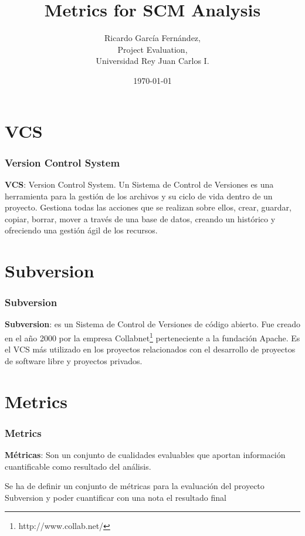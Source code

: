 \documentclass[xcolor=dvipsnames]{beamer}
\title{Metrics for SCM Analysis}
\author{Ricardo Garc\'ia Fern\'andez,\\
        Project Evaluation,\\
        Universidad Rey Juan Carlos I.}
\date{\today}
\begin{document}

\section[Index]{}
\begin{frame}[allowframebreaks]
\tableofcontents
\end{frame}

\section{VCS}
\begin{frame}[allowframebreaks]
\frametitle{Version Control System}

\textbf{VCS}: Version Control System. Un Sistema de Control de Versiones es una herramienta para la gesti\'on de los archivos y su ciclo de vida dentro de un proyecto. Gestiona todas las acciones que se realizan sobre ellos, crear, guardar, copiar, borrar, mover a través de una base de datos, creando un hist\'orico y ofreciendo una gesti\'on \'agil de los recursos.

\end{frame}

\section{Subversion}
\begin{frame}[allowframebreaks]
\frametitle{Subversion}
\textbf{Subversion}: es un Sistema de Control de Versiones de c\'odigo abierto.
Fue creado en el a\~no 2000 por la empresa Collabnet\footnote{http://www.collab.net/} perteneciente a la fundaci\'on Apache.
Es el VCS m\'as utilizado en los proyectos relacionados con el desarrollo de proyectos de software libre y proyectos privados.
\end{frame}

\section{Metrics}
\begin{frame}[allowframebreaks]
\frametitle{Metrics}
\textbf{M\'etricas}: Son un conjunto de cualidades evaluables que aportan informaci\'on cuantificable como resultado del an\'alisis.

\par Se ha de definir un conjunto de m\'etricas para la evaluaci\'on del proyecto Subversion y poder cuantificar con una nota el resultado final
\end{frame}
\end{document}
